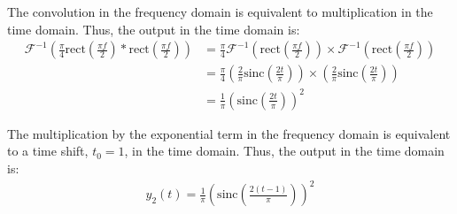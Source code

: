 \documentclass{article}
\begin{document}
\begin{enumerate}[label=2.\arabic*]
    The convolution in the frequency domain is equivalent to multiplication in the time domain. Thus, the output in the time domain is:
    \begin{align*}
        \mathcal{F}^{-1}\left(\frac{\pi}{4}\text{rect}\left(\frac{\pi f}{2}\right) \ast \text{rect}\left(\frac{\pi f}{2}\right)\right) &= \frac{\pi}{4} \mathcal{F}^{-1}\left(\text{rect}\left(\frac{\pi f}{2}\right)\right) \times \mathcal{F}^{-1}\left(\text{rect}\left(\frac{\pi f}{2}\right)\right) \\
        &= \frac{\pi}{4} \left(\frac{2}{\pi} \text{sinc}\left(\frac{2t}{\pi}\right)\right) \times \left(\frac{2}{\pi} \text{sinc}\left(\frac{2t}{\pi}\right)\right) \\
        &= \frac{1}{\pi}\left(\text{sinc}\left(\frac{2t}{\pi}\right)\right)^2 \
    \end{align*}

    The multiplication by the exponential term in the frequency domain is equivalent to a time shift, $t_0 = 1$,  in the time domain. Thus, the output in the time domain is:
    \begin{align*}
        y_2(t) = \boxed{\frac{1}{\pi}\left(\text{sinc}\left(\frac{2(t-1)}{\pi}\right)\right)^2}
    \end{align*}

\end{enumerate}
\end{document}
